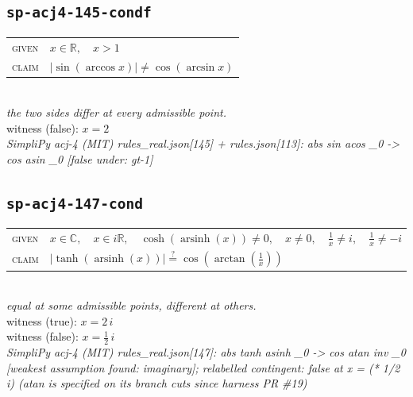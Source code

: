 \documentclass[11pt]{article}
\begin{document}
\subsection*{\texttt{sp-acj4-145-condf}}
\begin{tabular}{@{}l@{\quad}l@{}}
\textsc{given} & $x \in \mathbb{R},\quad x > 1$ \\[4pt]
\textsc{claim} & $\displaystyle \left|\sin\left(\arccos x\right)\right| \neq \cos\left(\arcsin x\right)$ \\
\end{tabular}\\[2pt]
{\small\emph{the two sides differ at every admissible point.}}\\
{\footnotesize\color{gray}witness (false): $x = 2$}\\
\emph{SimpliPy acj-4 (MIT) rules\_real.json[145] + rules.json[113]: abs sin acos \_0  ->  cos asin \_0  [false under: gt-1]}\\

\subsection*{\texttt{sp-acj4-147-cond}}
\begin{tabular}{@{}l@{\quad}l@{}}
\textsc{given} & $x \in \mathbb{C},\quad x \in i\mathbb{R},\quad \cosh\left(\operatorname{arsinh}\left(x\right)\right) \neq 0,\quad x \neq 0,\quad \frac{1}{x} \neq i,\quad \frac{1}{x} \neq -i$ \\[4pt]
\textsc{claim} & $\displaystyle \left|\tanh\left(\operatorname{arsinh}\left(x\right)\right)\right| \overset{?}{=} \cos\left(\arctan\left(\frac{1}{x}\right)\right)$ \\
\end{tabular}\\[2pt]
{\small\emph{equal at some admissible points, different at others.}}\\
{\footnotesize\color{gray}witness (true): $x = 2 \, i$}\\
{\footnotesize\color{gray}witness (false): $x = \frac{1}{2} \, i$}\\
\emph{SimpliPy acj-4 (MIT) rules\_real.json[147]: abs tanh asinh \_0  ->  cos atan inv \_0  [weakest assumption found: imaginary]; relabelled contingent: false at x = (* 1/2 i) (atan is specified on its branch cuts since harness PR \#19)}\\
\end{document}
